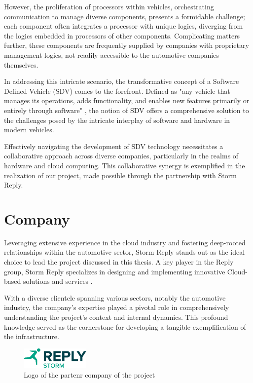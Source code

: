 However, the proliferation of processors within vehicles, orchestrating communication to manage diverse components, presents a formidable challenge; each component often integrates a processor with unique logics, diverging from the logics embedded in processors of other components. Complicating matters further, these components are frequently supplied by companies with proprietary management logics, not readily accessible to the automotive companies themselves.

In addressing this intricate scenario, the transformative concept of a Software Defined Vehicle (SDV) comes to the forefront. Defined as "any vehicle that manages its operations, adds functionality, and enables new features primarily or entirely through software"  \cite{blackberrySDV}, the notion of SDV offers a comprehensive solution to the challenges posed by the intricate interplay of software and hardware in modern vehicles.

Effectively navigating the development of SDV technology necessitates a collaborative approach across diverse companies, particularly in the realms of hardware and cloud computing. This collaborative synergy is exemplified in the realization of our project, made possible through the partnership with Storm Reply.


\section{Company}

Leveraging extensive experience in the cloud industry and fostering deep-rooted relationships within the automotive sector, Storm Reply stands out as the ideal choice to lead the project discussed in this thesis. A key player in the Reply group, Storm Reply specializes in designing and implementing innovative Cloud-based solutions and services \cite{StormReplySite}. 

With a diverse clientele spanning various sectors, notably the automotive industry, the company's expertise played a pivotal role in comprehensively understanding the project's context and internal dynamics. This profound knowledge served as the cornerstone for developing a tangible exemplification of the infrastructure.

\begin{figure}[h]  %
  \centering
  \includegraphics[width=0.3\textwidth]{images/Storm_Reply_logo.png}  %
  \caption{Logo of the partenr company of the project}
  \label{fig:StormReplyLogo}
\end{figure}

